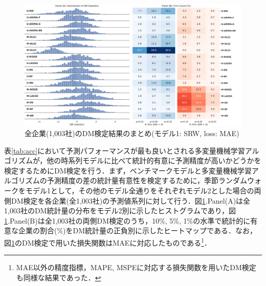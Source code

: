 \documentclass[a4paper，12pt]{jsarticle}
\begin{document}
\begin{figure}
  \centering
  \caption{全企業(1,003社)のDM検定結果のまとめ(モデル1: SRW, loss: MAE)}
  \label{fig:dm_srw}
  \includegraphics[width=15cm]{./img/_dm_MAD_y_hat_srw.pdf}
\end{figure}

表\ref{tab:acc}において予測パフォーマンスが最も良いとされる多変量機械学習アルゴリズムが，他の時系列モデルに比べて統計的有意に予測精度が高いかどうかを検定するためにDM検定を行う．まず，ベンチマークモデルと多変量機械学習アルゴリズムの予測精度の差の統計量有意性を検定するために，季節ランダムウォークをモデル1として，その他のモデル全通りをそれぞれモデル2とした場合の両側DM検定を各企業(全1,003社)の予測値系列に対して行う．図\ref{fig:dm_srw}.Panel(A)は全1,003社のDM統計量の分布をモデル2別に示したヒストグラムであり，図\ref{fig:dm_srw}.Panel(B)は全1,003社の両側DM検定のうち，10\%, 5\%, 1\%の水準で統計的に有意な企業の割合(\%)をDM統計量の正負別に示したヒートマップである．なお，図\ref{fig:dm_srw}のDM検定で用いた損失関数はMAEに対応したものである\footnote{MAE以外の精度指標，MAPE, MSPEに対応する損失関数を用いたDM検定も同様な結果であった．}．
\end{document}
